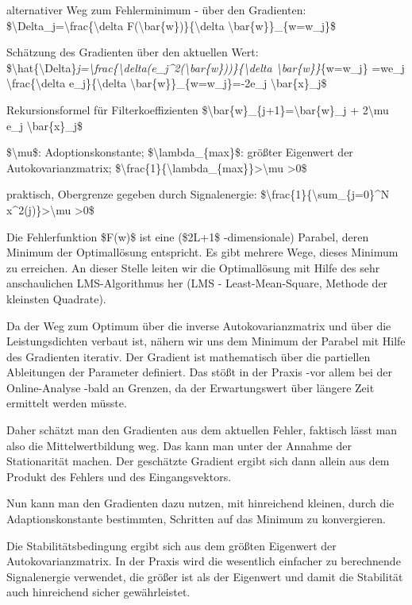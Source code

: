 \documentclass[a4paper]{article}
\begin{document}
\begin{multicols}{3}
  \begin{itemize*}
    \item alternativer Weg zum Fehlerminimum - über den Gradienten: \$\textbackslash Delta\_j=\textbackslash frac\{\textbackslash delta F(\textbackslash bar\{w\})\}\{\textbackslash delta \textbackslash bar\{w\}\}\textbar\_\{w=w\_j\}\$
    \item Schätzung des Gradienten über den aktuellen Wert: \$\textbackslash hat\{\textbackslash Delta\}\emph{j=\textbackslash frac\{\textbackslash delta(e\_j\^{}2(\textbackslash bar\{w\}))\}\{\textbackslash delta \textbackslash bar\{w\}\}\textbar{}}\{w=w\_j\} =we\_j \textbackslash frac\{\textbackslash delta e\_j\}\{\textbackslash delta \textbackslash bar\{w\}\}\textbar\_\{w=w\_j\}=-2e\_j \textbackslash bar\{x\}\_j\$
    \item Rekursionsformel für Filterkoeffizienten \$\textbackslash bar\{w\}\_\{j+1\}=\textbackslash bar\{w\}\_j + 2\textbackslash mu e\_j \textbackslash bar\{x\}\_j\$
    \item \$\textbackslash mu\$: Adoptionskonstante; \$\textbackslash lambda\_\{max\}\$: größter Eigenwert der Autokovarianzmatrix; \$\textbackslash frac\{1\}\{\textbackslash lambda\_\{max\}\}\textgreater\textbackslash mu \textgreater0\$
    \item praktisch, Obergrenze gegeben durch Signalenergie: \$\textbackslash frac\{1\}\{\textbackslash sum\_\{j=0\}\^{}N x\^{}2(j)\}\textgreater\textbackslash mu \textgreater0\$
    \item Die Fehlerfunktion \$F(w)\$ ist eine (\$2L+1\$ -dimensionale) Parabel, deren Minimum der Optimallösung entspricht. Es gibt mehrere Wege, dieses Minimum zu erreichen. An dieser Stelle leiten wir die Optimallösung mit Hilfe des sehr anschaulichen LMS-Algorithmus her (LMS - Least-Mean-Square, Methode der kleinsten Quadrate).
    \item Da der Weg zum Optimum über die inverse Autokovarianzmatrix und über die Leistungsdichten verbaut ist, nähern wir uns dem Minimum der Parabel mit Hilfe des Gradienten iterativ. Der Gradient ist mathematisch über die partiellen Ableitungen der Parameter definiert. Das stößt in der Praxis -vor allem bei der Online-Analyse -bald an Grenzen, da der Erwartungswert über längere Zeit ermittelt werden müsste.
    \item Daher schätzt man den Gradienten aus dem aktuellen Fehler, faktisch lässt man also die Mittelwertbildung weg. Das kann man unter der Annahme der Stationarität machen. Der geschätzte Gradient ergibt sich dann allein aus dem Produkt des Fehlers und des Eingangsvektors.
    \item Nun kann man den Gradienten dazu nutzen, mit hinreichend kleinen, durch die Adaptionskonstante bestimmten, Schritten auf das Minimum zu konvergieren.
    \item Die Stabilitätsbedingung ergibt sich aus dem größten Eigenwert der Autokovarianzmatrix. In der Praxis wird die wesentlich einfacher zu berechnende Signalenergie verwendet, die größer ist als der Eigenwert und damit die Stabilität auch hinreichend sicher gewährleistet.
  \end{itemize*}


\end{multicols}
\end{document}
